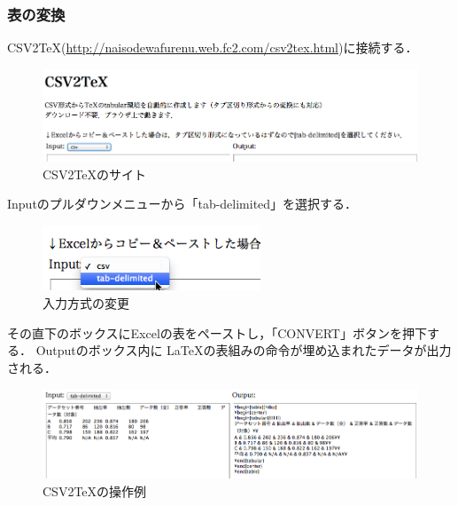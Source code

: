\subsubsection{表の変換}
CSV2TeX(\url{http://naisodewafurenu.web.fc2.com/csv2tex.html})に接続する．
\begin{figure}[H]
\begin{center}
\includegraphics[width=12cm]{csv2tex.png}
\vspace{-3mm}
\end{center}
\caption{CSV2TeXのサイト}
\label{fig:csv2tex}
\end{figure}

Inputのプルダウンメニューから「tab-delimited」を選択する．
\begin{figure}[H]
\begin{center}
\includegraphics[width=6.5cm]{inputTypeChange.png}
\end{center}
\caption{入力方式の変更}
\label{fig:inputTypeChange}
\end{figure}



その直下のボックスにExcelの表をペーストし，「CONVERT」ボタンを押下する．
Outputのボックス内に \LaTeX の表組みの命令が埋め込まれたデータが出力される．
\begin{figure}[htb]
\begin{center}
\includegraphics[width=14.5cm]{convertTable.png}
\end{center}
\caption{CSV2TeXの操作例}
\label{fig:convertTable}
\end{figure}

